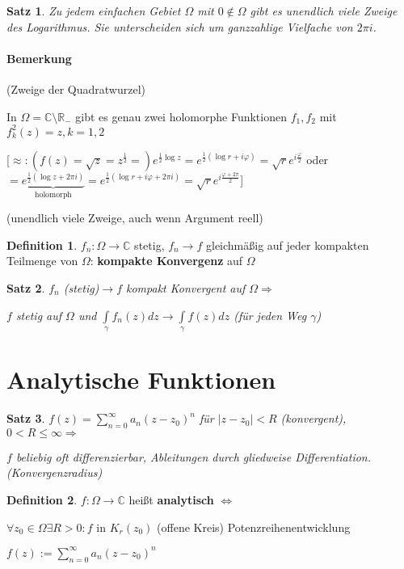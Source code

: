 \documentclass[ngerman,halfparskip]{scrartcl}
\newtheorem{satz}{Satz}[section]
\theoremstyle{definition}
\newtheorem{defin}{Definition}[section]
\def\R{\mathbb R}
\def\C{\mathbb C}
\begin{document}
\begin{satz} Zu jedem einfachen Gebiet $\Omega$ mit $0\notin\Omega$ gibt es unendlich viele Zweige des Logarithmus. Sie unterscheiden sich um ganzzahlige Vielfache von $2\pi i$.
\end{satz}
\paragraph{Bemerkung} (Zweige der Quadratwurzel)

In $\Omega=\C \setminus \R_-$ gibt es genau zwei holomorphe Funktionen $f_1,f_2$ mit $f_k^2(z)=z, k=1,2$

[$\approx: (f(z)=\sqrt z=z^{\frac 12}=)e^{\frac 12 \log z}=e^{\frac 12( \log r+i\varphi)}=\sqrt r e^{i\frac \varphi 2}$
oder $=\underbrace{e^{\frac 12 (\log z+2\pi i)}}_{\text{holomorph}}=e^{\frac 12 (\log r+i\varphi+2\pi i)}=\sqrt r e^{i\frac{\varphi+2\pi}{2}}$]

(unendlich viele Zweige, auch wenn Argument reell)

\begin{defin}
$f_n:\Omega \rightarrow\C$ stetig, $f_n\rightarrow f$ gleichmäßig auf jeder kompakten Teilmenge von $\Omega$: \textbf{kompakte Konvergenz} auf $\Omega$
\end{defin}

\begin{satz}
$f_n$ (stetig)$\rightarrow f$ kompakt Konvergent auf $\Omega \Rightarrow$

$f$ stetig auf $\Omega$ und $\int\limits_\gamma f_n(z)dz \rightarrow \int\limits_\gamma f(z) dz$ (für jeden Weg $\gamma$)
\end{satz}

\section{Analytische Funktionen}
\begin{satz}
$f(z)=\sum\limits_{n=0}^\infty a_n(z-z_0)^n$ für $|z-z_0|<R$ (konvergent), $0<R\leq \infty \Rightarrow$

$f$ beliebig oft differenzierbar, Ableitungen durch gliedweise Differentiation.  (Konvergenzradius)
\end{satz}

\begin{defin}
$f:\Omega\rightarrow \C$ heißt \textbf{analytisch} $\Leftrightarrow$

$\forall z_0 \in\Omega \exists R > 0 : f$ in $K_r(z_0)$ (offene Kreis) Potenzreihenentwicklung

$f(z):=\sum\limits_{n=0}^\infty a_n (z-z_0)^n$
\end{defin}
\end{document}
